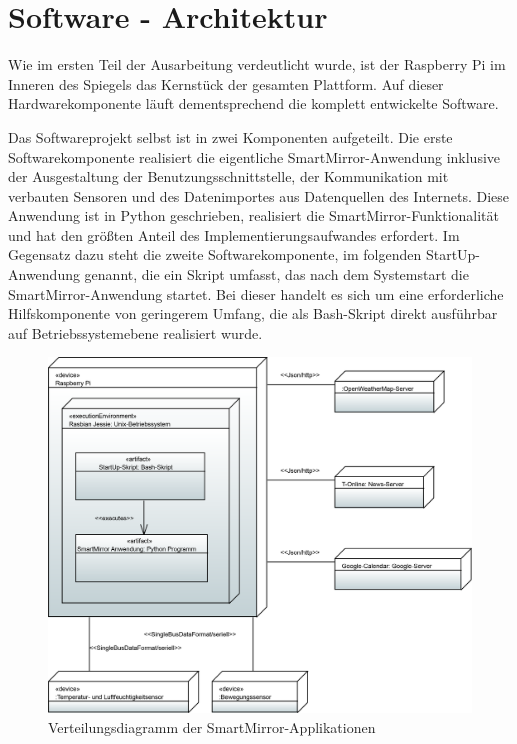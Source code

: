 \section{Software - Architektur}
\label{sec:softwarearchitektur}
Wie im ersten Teil der Ausarbeitung verdeutlicht wurde, ist der Raspberry Pi im Inneren des Spiegels das Kernstück der gesamten Plattform. Auf dieser Hardwarekomponente läuft dementsprechend die komplett entwickelte Software. 

Das Softwareprojekt selbst ist in zwei Komponenten aufgeteilt. Die erste Softwarekomponente realisiert die eigentliche SmartMirror-Anwendung inklusive der Ausgestaltung der Benutzungsschnittstelle, der Kommunikation mit verbauten Sensoren und des Datenimportes aus Datenquellen des Internets. Diese Anwendung ist in Python geschrieben, realisiert die SmartMirror-Funktionalität und hat den größten Anteil des Implementierungsaufwandes erfordert. Im Gegensatz dazu steht die zweite Softwarekomponente, im folgenden StartUp-Anwendung genannt, die ein Skript umfasst, das nach dem Systemstart die SmartMirror-Anwendung startet. Bei dieser handelt es sich um eine erforderliche Hilfskomponente von geringerem Umfang, die als Bash-Skript direkt ausführbar auf Betriebssystemebene realisiert wurde.  

\begin{figure}
	\centering
	\includegraphics[width=0.8\linewidth]{bilder/DeploymentDiagram}
	\caption[Verteilungsdiagramm der SmartMirror-Applikationen]{Verteilungsdiagramm der SmartMirror-Applikationen}
	\label{fig:verteilungsdiagramm}
\end{figure}

